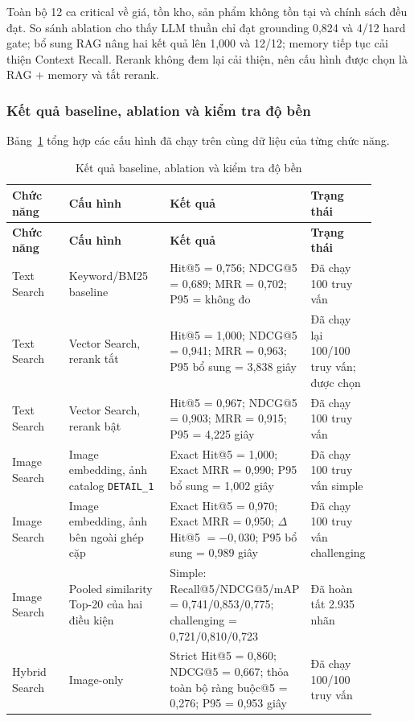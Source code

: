 Toàn bộ 12 ca critical về giá, tồn kho, sản phẩm không tồn tại và chính sách đều đạt. So sánh ablation cho thấy LLM thuần chỉ đạt grounding 0,824 và 4/12 hard gate; bổ sung RAG nâng hai kết quả lên 1,000 và 12/12; memory tiếp tục cải thiện Context Recall. Rerank không đem lại cải thiện, nên cấu hình được chọn là RAG + memory và tắt rerank.

\subsubsection{Kết quả baseline, ablation và kiểm tra độ bền}

Bảng~\ref{tab:baseline-result-template} tổng hợp các cấu hình đã chạy trên cùng dữ liệu của từng chức năng.
\begin{longtable}{|p{0.16\linewidth}|p{0.28\linewidth}|p{0.28\linewidth}|p{0.18\linewidth}|}
\caption{Kết quả baseline, ablation và kiểm tra độ bền}\label{tab:baseline-result-template}\\
\hline
\textbf{Chức năng} & \textbf{Cấu hình} & \textbf{Kết quả} & \textbf{Trạng thái} \\ \hline
\endfirsthead
\hline
\textbf{Chức năng} & \textbf{Cấu hình} & \textbf{Kết quả} & \textbf{Trạng thái} \\ \hline
\endhead
Text Search & Keyword/BM25 baseline & Hit@5 = 0,756; NDCG@5 = 0,689; MRR = 0,702; P95 = không đo & Đã chạy 100 truy vấn \\ \hline
Text Search & Vector Search, rerank tắt & Hit@5 = 1,000; NDCG@5 = 0,941; MRR = 0,963; P95 bổ sung = 3,838 giây & Đã chạy lại 100/100 truy vấn; được chọn \\ \hline
Text Search & Vector Search, rerank bật & Hit@5 = 0,967; NDCG@5 = 0,903; MRR = 0,915; P95 = 4,225 giây & Đã chạy 100 truy vấn \\ \hline
Image Search & Image embedding, ảnh catalog \texttt{DETAIL\_1} & Exact Hit@5 = 1,000; Exact MRR = 0,990; P95 bổ sung = 1,002 giây & Đã chạy 100 truy vấn simple \\ \hline
Image Search & Image embedding, ảnh bên ngoài ghép cặp & Exact Hit@5 = 0,970; Exact MRR = 0,950; $\Delta$ Hit@5 $=-0{,}030$; P95 bổ sung = 0,989 giây & Đã chạy 100 truy vấn challenging \\ \hline
Image Search & Pooled similarity Top-20 của hai điều kiện & Simple: Recall@5/NDCG@5/mAP = 0,741/0,853/0,775; challenging = 0,721/0,810/0,723 & Đã hoàn tất 2.935 nhãn \\ \hline
Hybrid Search & Image-only & Strict Hit@5 = 0,860; NDCG@5 = 0,667; thỏa toàn bộ ràng buộc@5 = 0,276; P95 = 0,953 giây & Đã chạy 100/100 truy vấn \\ \hline

\end{longtable}
